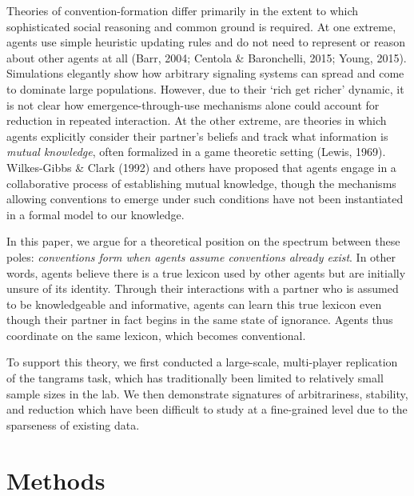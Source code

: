 \documentclass[alpha-refs]{wiley-article}
\begin{document}
Theories of convention-formation differ primarily in the extent to which
sophisticated social reasoning and common ground is required. At one
extreme, agents use simple heuristic updating rules and do not need to
represent or reason about other agents at all (Barr, 2004; Centola \&
Baronchelli, 2015; Young, 2015). Simulations elegantly show how
arbitrary signaling systems can spread and come to dominate large
populations. However, due to their `rich get richer' dynamic, it is not
clear how emergence-through-use mechanisms alone could account for
reduction in repeated interaction. At the other extreme, are theories in
which agents explicitly consider their partner's beliefs and track what
information is \emph{mutual knowledge}, often formalized in a game
theoretic setting (Lewis, 1969). Wilkes-Gibbs \& Clark (1992) and others
have proposed that agents engage in a collaborative process of
establishing mutual knowledge, though the mechanisms allowing
conventions to emerge under such conditions have not been instantiated
in a formal model to our knowledge.

In this paper, we argue for a theoretical position on the spectrum
between these poles: \emph{conventions form when agents assume
conventions already exist}. In other words, agents believe there is a
true lexicon used by other agents but are initially unsure of its
identity. Through their interactions with a partner who is assumed to be
knowledgeable and informative, agents can learn this true lexicon even
though their partner in fact begins in the same state of ignorance.
Agents thus coordinate on the same lexicon, which becomes conventional.

To support this theory, we first conducted a large-scale, multi-player
replication of the tangrams task, which has traditionally been limited
to relatively small sample sizes in the lab. We then demonstrate signatures
of arbitrariness, stability, and reduction which have been difficult to
study at a fine-grained level due to the sparseness of existing data.

\section{Methods}
\end{document}
